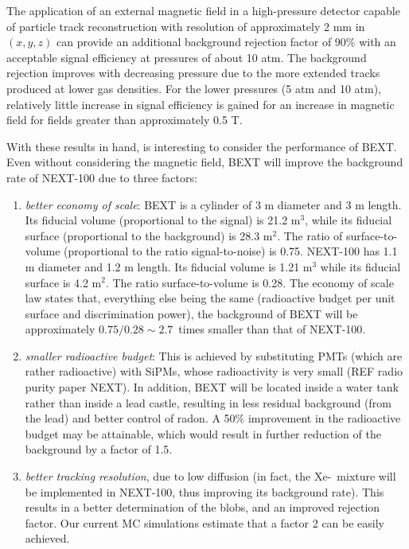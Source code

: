 \documentclass{JINST}
\begin{document}
The application of an external magnetic field in a high-pressure detector capable of particle track reconstruction with resolution of approximately 2 mm in $(x,y,z)$ can provide an additional background rejection factor of 90\% with an acceptable signal efficiency at pressures of about 10 atm.  The background rejection improves with decreasing pressure due to the more extended tracks produced at lower gas densities.  For the lower pressures (5 atm and 10 atm), relatively little increase in signal efficiency is gained for an increase in magnetic field for fields greater than approximately 0.5 T. 

With these results in hand, is interesting to consider the performance of BEXT. Even without considering the magnetic field, BEXT will improve the background rate of NEXT-100 due to three factors:
\begin{enumerate}
\item {\em better economy of scale}: BEXT is a cylinder of 3 m diameter and 3 m length. Its fiducial volume (proportional to the signal) is 21.2 m$^3$, while its fiducial surface (proportional to the background) is 28.3 m$^2$. The ratio of surface-to-volume (proportional to the ratio signal-to-noise) is 0.75.  NEXT-100 has 1.1 m diameter and 1.2 m length. Its fiducial volume is 1.21 m$^3$ while its fiducial surface is 4.2 m$^2$. The ratio surface-to-volume is 0.28. The economy of scale law states that, everything else being the same (radioactive budget per unit surface and discrimination power), the background of BEXT will be approximately 
$0.75/0.28 \sim 2.7$~times smaller than that of NEXT-100. 
\item {\em smaller radioactive budget}: This is achieved by substituting PMTs (which are rather radioactive) with SiPMs, whose radioactivity is very small (REF radio purity paper NEXT). In addition, BEXT will be located inside a water tank rather than inside a lead castle, resulting in less residual background (from the lead) and better control of radon. A 50\% improvement in the radioactive budget may be attainable, which would result in further reduction of the background by a factor of 1.5.
\item {\em better tracking resolution}, due to low diffusion (in fact, the Xe-\COT\ mixture will be implemented in NEXT-100, thus improving its background rate). This results in a better determination of the blobs, and an improved rejection factor. Our current MC simulations estimate that a factor 2 can be easily achieved.
\end{enumerate}
\end{document}
